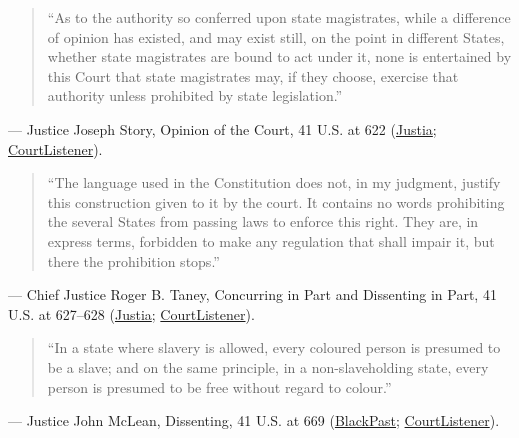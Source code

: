 \documentclass[12pt]{article}
\begin{document}
\begin{quote}
``As to the authority so conferred upon state magistrates, while a difference of opinion has existed, and may exist still, on the point in different States, whether state magistrates are bound to act under it, none is entertained by this Court that state magistrates may, if they choose, exercise that authority unless prohibited by state legislation.''
\end{quote}
\noindent--- Justice Joseph Story, Opinion of the Court, 41 U.S. at 622 (\href{https://supreme.justia.com/cases/federal/us/41/539/}{Justia}; \href{https://www.courtlistener.com/opinion/86231/prigg-v-pennsylvania/}{CourtListener}).

\begin{quote}
``The language used in the Constitution does not, in my judgment, justify this construction given to it by the court. It contains no words prohibiting the several States from passing laws to enforce this right. They are, in express terms, forbidden to make any regulation that shall impair it, but there the prohibition stops.''
\end{quote}
\noindent--- Chief Justice Roger B. Taney, Concurring in Part and Dissenting in Part, 41 U.S. at 627--628 (\href{https://supreme.justia.com/cases/federal/us/41/539/}{Justia}; \href{https://www.courtlistener.com/opinion/86231/prigg-v-pennsylvania/}{CourtListener}).

\begin{quote}
``In a state where slavery is allowed, every coloured person is presumed to be a slave; and on the same principle, in a non-slaveholding state, every person is presumed to be free without regard to colour.''
\end{quote}
\noindent--- Justice John McLean, Dissenting, 41 U.S. at 669 (\href{https://blackpast.org/african-american-history/prigg-v-pennsylvania-1842/}{BlackPast}; \href{https://www.courtlistener.com/opinion/86231/prigg-v-pennsylvania/}{CourtListener}).
\end{document}
